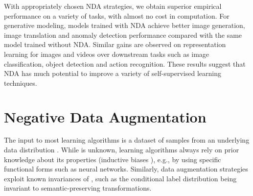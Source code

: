 \documentclass{article} \usepackage{iclr2021_conference,times}
\begin{document}
With appropriately chosen NDA strategies, we obtain superior empirical performance on a variety of tasks, with almost no cost in computation. For generative modeling, models trained with NDA achieve better image generation, image translation and anomaly detection performance compared with the same model trained without NDA. Similar gains are observed on representation learning for images and videos over downstream tasks such as image classification, object detection and action recognition. These results suggest that NDA has much potential to improve a variety of self-supervised learning techniques.
























































 
\section{Negative Data Augmentation}
The input to most 
learning algorithms 
is a dataset of samples from an underlying data distribution . While  is unknown, learning algorithms always rely on prior knowledge about its properties (inductive biases \citep{wolpert1997no}), e.g., by using specific functional forms such as neural networks. Similarly, data augmentation strategies exploit known invariances of , such as the conditional label distribution being invariant to 
semantic-preserving transformations.
\end{document}
